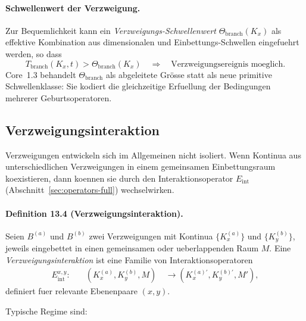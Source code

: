 \paragraph{Schwellenwert der Verzweigung.}
Zur Bequemlichkeit kann ein \emph{Verzweigungs-Schwellenwert}
\(\Theta_{\mathrm{branch}}(K_x)\) als effektive Kombination aus dimensionalen und
Einbettungs-Schwellen eingefuehrt werden, so dass
\[
  T_{\mathrm{branch}}(K_x,t) > \Theta_{\mathrm{branch}}(K_x)
  \quad\Rightarrow\quad
  \text{Verzweigungsereignis moeglich.}
\]
Core~1.3 behandelt \(\Theta_{\mathrm{branch}}\) als abgeleitete Grösse statt als neue
primitive Schwellenklasse: Sie kodiert die gleichzeitige Erfuellung der Bedingungen
mehrerer Geburtsoperatoren.

\subsection{Verzweigungsinteraktion}

Verzweigungen entwickeln sich im Allgemeinen nicht isoliert. Wenn Kontinua aus
unterschiedlichen Verzweigungen in einem gemeinsamen Einbettungsraum koexistieren,
dann koennen sie durch den Interaktionsoperator \(E_{\mathrm{int}}\)
(Abschnitt~\ref{sec:operators-full}) wechselwirken.

\paragraph{Definition 13.4 (Verzweigungsinteraktion).}
Seien \(B^{(a)}\) und \(B^{(b)}\) zwei Verzweigungen mit Kontinua
\(\{K_x^{(a)}\}\) und \(\{K_y^{(b)}\}\), jeweils eingebettet in einen gemeinsamen
oder ueberlappenden Raum \(M\). Eine \emph{Verzweigungsinteraktion} ist eine
Familie von Interaktionsoperatoren
\[
\begin{aligned}
  E_{\mathrm{int}}^{x,y}:\quad
    &(K_x^{(a)}, K_y^{(b)}, M)\
    &\longrightarrow (K_x^{(a)\prime}, K_y^{(b)\prime}, M'),
\end{aligned}
\]
definiert fuer relevante Ebenenpaare \((x,y)\).

Typische Regime sind:

